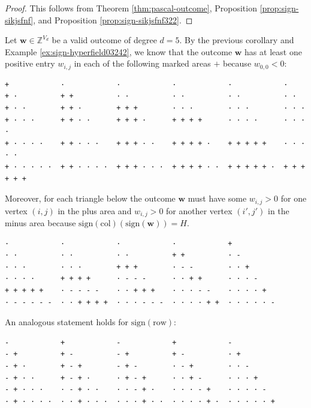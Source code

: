 \begin{proof}
    This follows from Theorem \ref{thm:pascal-outcome}, Proposition \ref{prop:sign-sikjsfnf}, and Proposition \ref{prop:sign-sikjsfnf322}.
\end{proof}

\begin{example}\label{ex:sjiu2ui3diag}
    Let \( \mathbf{w} \in \mathbb{Z}^{V_d} \) be a valid outcome of degree \( d = 5 \). By the previous corollary and Example \ref{ex:sign-hyperfield03242}, we know that the outcome \( \mathbf{w} \) has at least one positive entry \( w_{i,j} \) in each of the following marked areas \( + \) because \( w_{0,0} < 0 \):
    \begin{verbatim}
+            ·            ·            ·            ·            ·
+ ·          + +          · ·          · ·          · ·          · ·
+ · ·        + + ·        + + +        · · ·        · · ·        · · ·
+ · · ·      + + · ·      + + + ·      + + + +      · · · ·      · · · ·
+ · · · ·    + + · · ·    + + + · ·    + + + + ·    + + + + +    · · · · ·
+ · · · · ·  + + · · · ·  + + + · · ·  + + + + · ·  + + + + + ·  + + + + + +
    \end{verbatim}
    Moreover, for each triangle below the outcome \( \mathbf{w} \) must have some \( w_{i,j} > 0 \) for one vertex \( (i,j) \) in the plus area and \( w_{i,j} > 0 \) for another vertex \( (i',j') \) in the minus area because \( \mathrm{sign}(\mathrm{col})(\mathrm{sign}(\mathbf{w})) = H \).
    \begin{verbatim}
·            ·            ·            ·            +
· ·          · ·          · ·          + +          · -
· · ·        · · ·        + + +        · - -        · · +
· · · ·      + + + +      · - - -      · · + +      · · · -
+ + + + +    · - - - -    · · + + +    · · · - -    · · · · +
· - - - - -  · · + + + +  · · · - - -  · · · · + +  · · · · · -
\end{verbatim}
    An analogous statement holds for \( \mathrm{sign}(\mathrm{row}) \):
    \begin{verbatim}
-            +            -            +            -
- +          + -          - +          + -          · +
- + ·        + - +        - + -        · - +        · · -
- + · ·      + - + ·      · + - +      · · + -      · · · +
- + · · ·    · - + · ·    · · - + ·    · · · - +    · · · · -
· + · · · ·  · · + · · ·  · · · + · ·  · · · · + ·  · · · · · +
    \end{verbatim}
\end{example}

